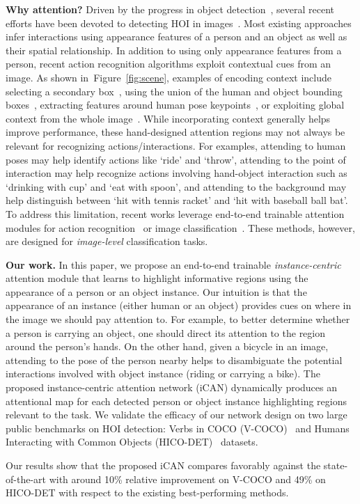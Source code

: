 \documentclass{bmvc2k}
\newcommand{\figref}[1]{Figure~\ref{fig:#1}}
\newcommand {\jiabin}[1]{{\color{blue}\textbf{Jia-Bin: }#1}\normalfont}
\renewcommand{\jiabin}[1]{}
\begin{document}
\textbf{Why attention?} 
Driven by the progress in object detection~\cite{He-ICCV-MaskRCNN,Ren-NIPS-FasterRCNN}, several recent efforts have been devoted to detecting HOI in images~\cite{Chao-WACV-HOI,Gkioxari-CVPR-InteractNet,Gupta-SemanticRoleLabeling,Shen-WACV-Zeroshot}.
Most existing approaches infer interactions using appearance features of a person and an object as well as their spatial relationship.
In addition to using only appearance features from a person, recent action recognition algorithms exploit contextual cues from an image.
As shown in~\figref{scene}, examples of encoding context include selecting a secondary box~\cite{Gkioxari-ICCV-R*CNN}, using the union of the human and object bounding boxes~\cite{Lu-ECCV-Prior}, extracting features around human pose keypoints~\cite{Cheron-ICCV-PCNN}, or exploiting global context from the whole image~\cite{Mallya-ECCV-Interactions}.
While incorporating context generally helps improve performance, these hand-designed attention regions may not always be relevant for recognizing actions/interactions.
For examples, attending to human poses may help identify actions like `ride' and `throw', attending to the point of interaction may help recognize actions involving hand-object interaction such as `drinking with cup' and `eat with spoon', and attending to the background may help distinguish between `hit with tennis racket' and `hit with baseball ball bat'.
To address this limitation, recent works leverage end-to-end trainable attention modules for action recognition~\cite{Girdhar-NIPS-AttentionalPooling} or image classification~\cite{Jetley-ICLR-PayAttention}.
These methods, however, are designed for \emph{image-level} classification tasks.


\textbf{Our work.} In this paper, we propose an end-to-end trainable \emph{instance-centric} attention module that learns to highlight informative regions using the appearance of a person or an object instance.
Our intuition is that the appearance of an instance (either human or an object) provides cues on where in the image we should pay attention to.
For example, to better determine whether a person is carrying an object, one should direct its attention to the region around the person's hands.
On the other hand, given a bicycle in an image, attending to the pose of the person nearby helps to disambiguate the potential interactions involved with object instance (\eg riding or carrying a bike).
The proposed instance-centric attention network (iCAN) dynamically produces an attentional map for each detected person or object instance highlighting regions relevant to the task.
We validate the efficacy of our network design on two large public benchmarks on HOI detection: Verbs in COCO (V-COCO)~\cite{Gupta-SemanticRoleLabeling} and Humans Interacting with Common Objects (HICO-DET)~\cite{Chao-WACV-HOI} datasets.
\jiabin{HICO results need to be updated. I also updated the V-COCO improvement because we added BAR-CNN.}
Our results show that the proposed iCAN compares favorably against the state-of-the-art with around 10\% relative improvement on V-COCO and 49\% on HICO-DET with respect to the existing best-performing methods.
\end{document}
